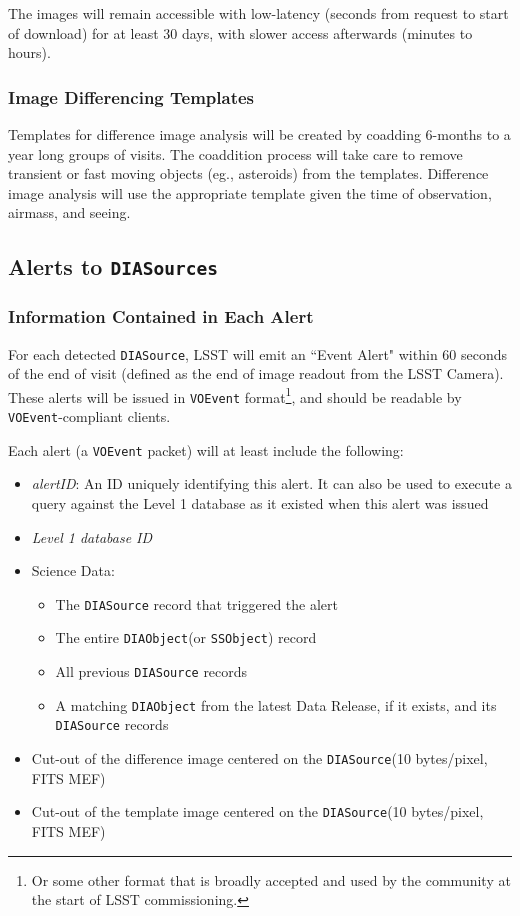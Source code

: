 \documentclass[12pt]{article}
\newcommand{\code}[1]{\texttt{#1}}
\newcommand{\DIASource}{\code{DIASource}\xspace}
\newcommand{\DIASources}{\code{DIASources}\xspace}
\newcommand{\DIAObject}{\code{DIAObject}\xspace}
\newcommand{\DB}{{Level 1 database}\xspace}
\newcommand{\SSObject}{\code{SSObject}\xspace}
\newcommand{\VOEvent}{\code{VOEvent}\xspace}
\begin{document}
The images will remain accessible with low-latency (seconds from request to start of download) for at least 30 days, with slower access afterwards (minutes to hours).

\subsubsection{Image Differencing Templates}
\label{sec:templates}

Templates for difference image analysis will be created by coadding 6-months to a year long groups of visits. The coaddition process will take care to remove transient or fast moving objects (eg., asteroids) from the templates.
Difference image analysis will use the appropriate template given the time of observation, airmass, and seeing.

\subsection{Alerts to \DIASources}
\label{sec:voEventContents}

\subsubsection{Information Contained in Each Alert}

For each detected \DIASource, LSST will emit an ``Event Alert" within 60 seconds of the end of visit (defined as the end of image readout from the LSST Camera). These alerts will be issued in \VOEvent format\footnote{Or some other format that is broadly accepted and used by the community at the start of LSST commissioning.}, and should be readable by \VOEvent-compliant clients.

\vspace{1em}
Each alert (a \VOEvent packet) will at least include the following:

\begin{itemize}
\item {\em alertID}: An ID uniquely identifying this alert. It can also be used to execute a query against the \DB as it existed when this alert was issued
\item {\em \DB ID}   %
\item Science Data:
    \begin{itemize}
    \item The \DIASource record that triggered the alert
    \item The entire \DIAObject (or \SSObject) record
    \item All previous \DIASource records
    \item A matching \DIAObject from the latest Data Release, if it exists, and its \DIASource records
    \end{itemize}
\item Cut-out of the difference image centered on the \DIASource (10 bytes/pixel, FITS MEF)
\item Cut-out of the template image centered on the \DIASource (10 bytes/pixel, FITS MEF)
\end{itemize}
\end{document}
